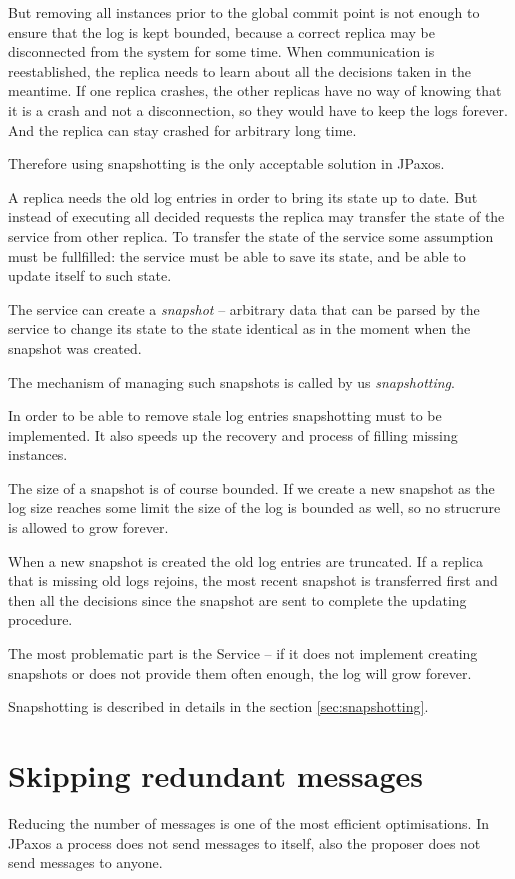 But removing all instances prior to the global commit point is not enough to ensure that the log is kept bounded, because a correct replica may be disconnected from the system for some time. When communication is reestablished, the replica needs to learn about all the decisions taken in the meantime. If one replica crashes, the other replicas have no way of knowing that it is a crash and not a disconnection, so they would have to keep the logs forever. And the replica can stay crashed for arbitrary long time.

Therefore using snapshotting is the only acceptable solution in JPaxos.


A replica needs the old log entries in order to bring its state up to date. But instead of executing all decided requests the replica may transfer the state of the service from other replica. To transfer the state of the service some assumption must be fullfilled: the service must be able to save its state, and be able to update itself to such state.

The service can create a \textit{snapshot} -- arbitrary data that can be parsed by the service to change its state to the state identical as in the moment when the snapshot was created.

The mechanism of managing such snapshots is called by us \textit{snapshotting}.

In order to be able to remove stale log entries snapshotting must to be implemented. It also speeds up the recovery and process of filling missing instances.

The size of a snapshot is of course bounded. If we create a new snapshot as the log size reaches some limit the size of the log is bounded as well, so no strucrure is allowed to grow forever.

When a new snapshot is created the old log entries are truncated. If a replica that is missing old logs rejoins, the most recent snapshot is transferred first and then all the decisions since the snapshot are sent to complete the updating procedure.

The most problematic part is the Service -- if it does not implement creating snapshots or does not provide them often enough, the log will grow forever.

Snapshotting is described in details in the section \ref{sec:snapshotting}.

\section{Skipping redundant messages}
Reducing the number of messages is one of the most efficient optimisations. In JPaxos a process does not send messages to itself, also the proposer does not send \accept messages to anyone.

